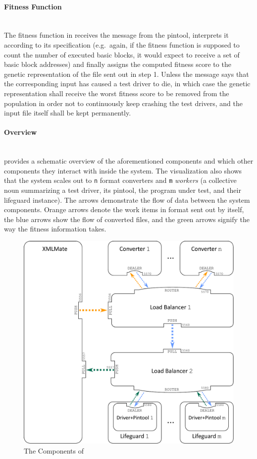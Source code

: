   \paragraph{Fitness Function} ~\\
  The fitness function in \xmlmate receives the message from the pintool, interprets it according to 
  its specification (e.g.\ again, if the fitness function is supposed to count the number of executed basic
  blocks, it would expect to receive a set of basic block addresses) and finally assigns the computed fitness score to 
  the genetic representation of the \xml file sent out in step 1. Unless the message says that the
  corresponding input has caused a test driver to die, in which case the genetic representation shall receive
  the worst fitness score to be removed from the population in order not to continuously keep crashing the test
  drivers, and the input file itself shall be kept permanently.

\paragraph{Overview} ~\\
 provides a schematic overview of the aforementioned components and which other components 
they interact with inside the system. The visualization also shows that the system scales out to \texttt{n}
format converters and \texttt{m} \emph{workers} (a collective noun summarizing a test driver, its
pintool, the program under test, and their lifeguard instance). The arrows demonstrate the flow of data between
the system components. Orange arrows denote the work items in \xml format sent out by \xmlmate itself, the blue arrows show
the flow of converted files, and the green arrows signify the way the fitness information takes.

\begin{figure}[htb]
\centering
  \includegraphics[width=\columnwidth]{system.pdf} 
  \caption{The Components of \xmlmate}
  \label{fig:components}
\end{figure}

